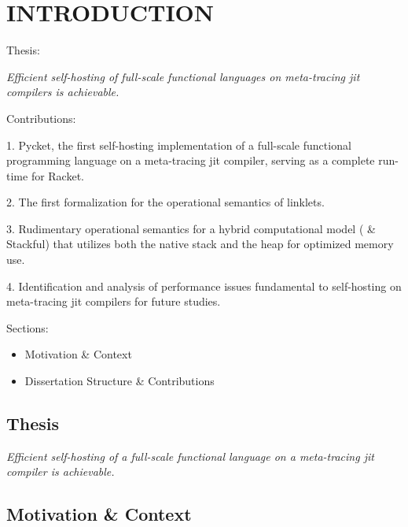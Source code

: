 \chapter[\texorpdfstring{INTRODUCTION}
                          {1. Introduction}]{INTRODUCTION}
    \label{chapter:introduction}

    \begin{chaptersynopsis}
        \footnotesize

       Thesis:

        \textit{Efficient self-hosting of full-scale functional languages on meta-tracing \gls{jit} compilers is achievable.}

        \vspace{2em}

        Contributions:

        1. Pycket, the first self-hosting implementation of a full-scale functional programming language on a meta-tracing \gls{jit} compiler, serving as a complete run-time for Racket.

        2. The first formalization for the operational semantics of linklets.

        3. Rudimentary operational semantics for a hybrid computational model ( \& Stackful) that utilizes both the native stack and the heap for optimized memory use.

        4. Identification and analysis of performance issues fundamental to self-hosting on meta-tracing \gls{jit} compilers for future studies.

        \vspace{2em}

        Sections:
		\begin{itemize}
			\item Motivation \& Context
			\item Dissertation Structure \& Contributions
		\end{itemize}
    \end{chaptersynopsis}

    \section{Thesis}

    \textit{Efficient self-hosting of a full-scale functional language on a meta-tracing \gls{jit} compiler is achievable.}


    \section[\texorpdfstring{Motivation \& Context}{Context}]{Motivation \& Context}

